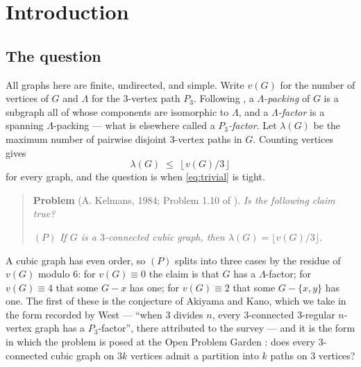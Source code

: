 \documentclass[11pt]{amsart}
\newcommand{\Lam}{\Lambda}
\newcommand{\vv}{v}
\theoremstyle{plain}
\theoremstyle{definition}
\theoremstyle{remark}
\begin{document}
\maketitle

\section{Introduction}\label{sec:intro}

\subsection{The question}\label{ssec:question}
All graphs here are finite, undirected, and simple. Write $\vv(G)$ for
the number of vertices of $G$ and $\Lam$ for the $3$-vertex path $P_3$.
Following \cite{Kel11}, a \emph{$\Lam$-packing} of $G$ is a subgraph all
of whose components are isomorphic to $\Lam$, and a \emph{$\Lam$-factor}
is a spanning $\Lam$-packing --- what is elsewhere called a
\emph{$P_3$-factor}. Let $\lambda(G)$ be the maximum number of pairwise
disjoint $3$-vertex paths in $G$. Counting vertices gives
\begin{equation}\label{eq:trivial}
  \lambda(G)\;\le\;\left\lfloor \vv(G)/3 \right\rfloor
\end{equation}
for every graph, and the question is when \eqref{eq:trivial} is tight.

\begin{quote}
\textbf{Problem} (A. Kelmans, 1984; Problem 1.10 of \cite{Kel11}).
\emph{Is the following claim true?}
\smallskip

\noindent $(P)$ \emph{If $G$ is a $3$-connected cubic graph, then
$\lambda(G)=\lfloor \vv(G)/3\rfloor$.}
\end{quote}

\noindent A cubic graph has even order, so $(P)$ splits into three cases
by the residue of $\vv(G)$ modulo $6$: for $\vv(G)\equiv 0$ the claim is
that $G$ has a $\Lam$-factor; for $\vv(G)\equiv 4$ that some $G-x$ has
one; for $\vv(G)\equiv 2$ that some $G-\{x,y\}$ has one. The first of
these is the conjecture of Akiyama and Kano, which we take in the form
recorded by West \cite{West} --- ``when $3$ divides $n$, every
$3$-connected $3$-regular $n$-vertex graph has a $P_3$-factor'', there
attributed to the survey \cite{AK85} --- and it
is the form in which the problem is posed at the Open Problem Garden
\cite{OPG}: does every $3$-connected cubic graph on $3k$ vertices admit a
partition into $k$ paths on $3$ vertices?
\end{document}
